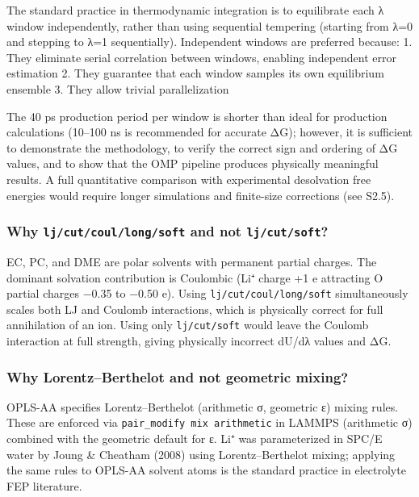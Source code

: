 \documentclass[
  11pt,
]{article}
\begin{document}
The standard practice in thermodynamic integration is to equilibrate
each λ window independently, rather than using sequential tempering
(starting from λ=0 and stepping to λ=1 sequentially). Independent
windows are preferred because: 1. They eliminate serial correlation
between windows, enabling independent error estimation 2. They guarantee
that each window samples its own equilibrium ensemble 3. They allow
trivial parallelization

The 40 ps production period per window is shorter than ideal for
production calculations (10--100 ns is recommended for accurate ΔG);
however, it is sufficient to demonstrate the methodology, to verify the
correct sign and ordering of ΔG values, and to show that the OMP
pipeline produces physically meaningful results. A full quantitative
comparison with experimental desolvation free energies would require
longer simulations and finite-size corrections (see S2.5).

\subsubsection{\texorpdfstring{Why \texttt{lj/cut/coul/long/soft} and
not
\texttt{lj/cut/soft}?}{Why lj/cut/coul/long/soft and not lj/cut/soft?}}\label{why-ljcutcoullongsoft-and-not-ljcutsoft}

EC, PC, and DME are polar solvents with permanent partial charges. The
dominant solvation contribution is Coulombic (Li⁺ charge +1 e attracting
O partial charges −0.35 to −0.50 e). Using
\texttt{lj/cut/coul/long/soft} simultaneously scales both LJ and Coulomb
interactions, which is physically correct for full annihilation of an
ion. Using only \texttt{lj/cut/soft} would leave the Coulomb interaction
at full strength, giving physically incorrect dU/dλ values and ΔG.

\subsubsection{Why Lorentz--Berthelot and not geometric
mixing?}\label{why-lorentzberthelot-and-not-geometric-mixing}

OPLS-AA specifies Lorentz--Berthelot (arithmetic σ, geometric ε) mixing
rules. These are enforced via \texttt{pair\_modify\ mix\ arithmetic} in
LAMMPS (arithmetic σ) combined with the geometric default for ε. Li⁺ was
parameterized in SPC/E water by Joung \& Cheatham (2008) using
Lorentz--Berthelot mixing; applying the same rules to OPLS-AA solvent
atoms is the standard practice in electrolyte FEP literature.
\end{document}
